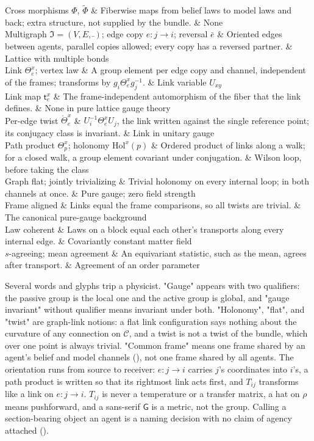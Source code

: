 \begin{decoder}
Cross morphisms $\Phi$, $\widetilde\Phi$ & Fiberwise maps from belief laws to model laws and back; extra structure, not supplied by the bundle. & None \\
Multigraph $\mathfrak I=(V,E,\bar{\ })$; edge copy $e:j\to i$; reversal $\bar e$ & Oriented edges between agents, parallel copies allowed; every copy has a reversed partner. & Lattice with multiple bonds \\
Link $\Theta_e^x$; vertex law & A group element per edge copy and channel, independent of the frames; transforms by $g_i\Theta_e^xg_j^{-1}$. & Link variable $U_{xy}$ \\
Link map $\mathsf t_e^x$ & The frame-independent automorphism of the fiber that the link defines. & None in pure lattice gauge theory \\
Per-edge twist $\mathring\Theta_e^x$ & $U_i^{-1}\Theta_e^xU_j$, the link written against the single reference point; its conjugacy class is invariant. & Link in unitary gauge \\
Path product $\Theta_p^x$; holonomy $\mathrm{Hol}^x(p)$ & Ordered product of links along a walk; for a closed walk, a group element covariant under conjugation. & Wilson loop, before taking the class \\
Graph flat; jointly trivializing & Trivial holonomy on every internal loop; in both channels at once. & Pure gauge; zero field strength \\
Frame aligned & Links equal the frame comparisons, so all twists are trivial. & The canonical pure-gauge background \\
Law coherent & Laws on a block equal each other's transports along every internal edge. & Covariantly constant matter field \\
$s$-agreeing; mean agreement & An equivariant statistic, such as the mean, agrees after transport. & Agreement of an order parameter \\
\end{decoder}

Several words and glyphs trip a physicist. "Gauge" appears with two qualifiers: the passive group is the local
one and the active group is global, and "gauge invariant" without qualifier means invariant under both.
"Holonomy", "flat", and "twist" are graph-link notions: a flat link configuration says nothing about the
curvature of any connection on $\mathcal C$, and a twist is not a twist of the bundle, which over one point is
always trivial. "Common frame" means one frame shared by an agent's belief and model channels
(), not one frame shared by all agents. The orientation runs from source to
receiver: $e:j\to i$ carries $j$'s coordinates into $i$'s, a path product is written so that its rightmost link
acts first, and $T_{ij}$ transforms like a link on $e:j\to i$. $T_{ij}$ is never a temperature or a transfer
matrix, a hat on $\rho$ means pushforward, and a sans-serif $\mathsf G$ is a metric, not the group. Calling a
section-bearing object an agent is a naming decision with no claim of agency attached
().

